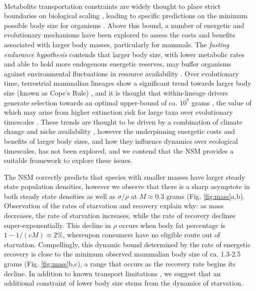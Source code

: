 \documentclass{pnastwo}
\begin{document}
\begin{article}






\vspace{2mm}
 \\ \nonumber
Metabolite transportation constraints are widely thought to place strict boundaries on biological scaling \cite{Brown:1993p708,West:1997cg,Brown:2004wq}, leading to specific predictions on the minimum possible body size for organisms \cite{West:2002ud}.
Above this bound, a number of energetic and evolutionary mechanisms have been explored to assess the costs and benefits associated with larger body masses, particularly for mammals.
The \emph{fasting endurance hypothesis} contends that larger body size, with lower metabolic rates and able to hold more endogenous energetic reserves, may buffer organisms against environmental fluctuations in resource availability \cite{Millar:1990p923}.
Over evolutionary time, terrestrial mammalian lineages show a significant trend towards larger body size (known as Cope's Rule) \cite{Alroy:1998p1594,Clauset:2009fh,Smith:2010p3442,Saarinen:2014br}, and it is thought that within-lineage drivers generate selection towards an optimal upper-bound of ca. $10^7$ grams \cite{Alroy:1998p1594}, the value of which may arise from higher extinction risk for large taxa over evolutionary timescales \cite{Clauset:2009fh}.
These trends are thought to be driven by a combination of climate change and niche availability \cite{Saarinen:2014br}, however the underpinning energetic costs and benefits of larger body sizes, and how they influence dynamics over ecological timescales, has not been explored, and we contend that the NSM provides a suitable framework to explore these issues.

The NSM correctly predicts that species with smaller masses have larger steady state population densities, however we observe that there is a sharp asymptote in both steady state densities as well as $\sigma/\rho$ at $M \approx 0.3$ grams  (Fig. \ref{fig:mass}a,b).
Observation of the rates of starvation and recovery explain why: as mass decreases, the rate of starvation increases, while the rate of recovery declines super-exponentially.
This decline in $\rho$ occurs when body fat percentage is $1 - 1/(cM) \approx 2\%$, whereupon consumers have no eligible route out of starvation.
Compellingly, this dynamic bound determined by the rate of energetic recovery is close to the minimum observed mammalian body size of ca. 1.3-2.5 grams (Fig. \ref{fig:mass}b,c), a range that occurs as the recovery rate begins its decline.
In addition to known transport limitations \cite{West:2002ud}, we suggest that an additional constraint of lower body size stems from the dynamics of starvation.


\end{article}
\end{document}
